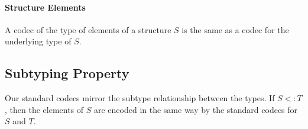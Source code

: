 \paragraph{Structure Elements}
A codec of the type of elements of a structure $S$ is the same as a codec for the underlying type of $S$.

\subsection{Subtyping Property}

Our standard codecs mirror the subtype relationship between the types.
If $S<: T$, then the elements of $S$ are encoded in the same way by the standard codecs for $S$ and $T$.

